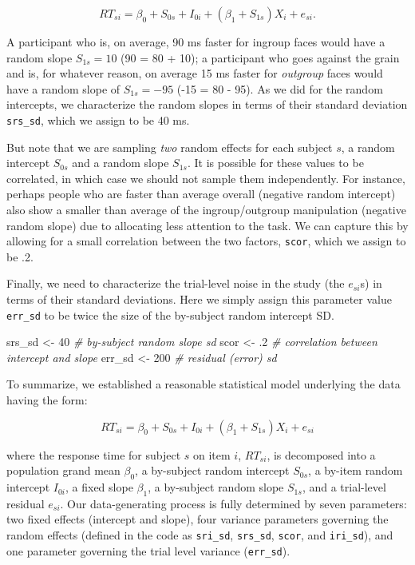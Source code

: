 \documentclass[man,floatsintext]{apa6}
\newenvironment{Shaded}{\begin{snugshade}}{\end{snugshade}}
\newcommand{\DecValTok}[1]{\textcolor[rgb]{0.00,0.00,0.81}{#1}}
\newcommand{\StringTok}[1]{\textcolor[rgb]{0.31,0.60,0.02}{#1}}
\newcommand{\CommentTok}[1]{\textcolor[rgb]{0.56,0.35,0.01}{\textit{#1}}}
\newcommand{\NormalTok}[1]{#1}
\begin{document}
\[RT_{si} = \beta_0 + S_{0s} + I_{0i} + \left(\beta_1 + S_{1s}\right) X_i + e_{si}.\]

A participant who is, on average, 90 ms faster for ingroup faces would
have a random slope \(S_{1s} = 10\) (90 = 80 + 10); a participant who
goes against the grain and is, for whatever reason, on average 15 ms
faster for \emph{outgroup} faces would have a random slope of
\(S_{1s} = -95\) (-15 = 80 - 95). As we did for the random intercepts,
we characterize the random slopes in terms of their standard deviation
\texttt{srs\_sd}, which we assign to be 40 ms.

But note that we are sampling \emph{two} random effects for each subject
\(s\), a random intercept \(S_{0s}\) and a random slope \(S_{1s}\). It
is possible for these values to be correlated, in which case we should
not sample them independently. For instance, perhaps people who are
faster than average overall (negative random intercept) also show a
smaller than average of the ingroup/outgroup manipulation (negative
random slope) due to allocating less attention to the task. We can
capture this by allowing for a small correlation between the two
factors, \texttt{scor}, which we assign to be .2.

Finally, we need to characterize the trial-level noise in the study (the
\(e_{si}\)s) in terms of their standard deviations. Here we simply
assign this parameter value \texttt{err\_sd} to be twice the size of the
by-subject random intercept SD.

\begin{Shaded}
\begin{Highlighting}[]
\NormalTok{srs_sd <-}\StringTok{  }\DecValTok{40} \CommentTok{# by-subject random slope sd}
\NormalTok{scor   <-}\StringTok{  }\NormalTok{.}\DecValTok{2} \CommentTok{# correlation between intercept and slope}
\NormalTok{err_sd <-}\StringTok{ }\DecValTok{200} \CommentTok{# residual (error) sd}
\end{Highlighting}
\end{Shaded}

To summarize, we established a reasonable statistical model underlying
the data having the form:

\[RT_{si} = \beta_0 + S_{0s} + I_{0i} + \left(\beta_1 + S_{1s}\right) X_i + e_{si}\]

where the response time for subject \(s\) on item \(i\), \(RT_{si}\), is
decomposed into a population grand mean \(\beta_0\), a by-subject random
intercept \(S_{0s}\), a by-item random intercept \(I_{0i}\), a fixed
slope \(\beta_1\), a by-subject random slope \(S_{1s}\), and a
trial-level residual \(e_{si}\). Our data-generating process is fully
determined by seven parameters: two fixed effects (intercept and slope),
four variance parameters governing the random effects (defined in the
code as \texttt{sri\_sd}, \texttt{srs\_sd}, \texttt{scor}, and
\texttt{iri\_sd}), and one parameter governing the trial level variance
(\texttt{err\_sd}).
\end{document}
